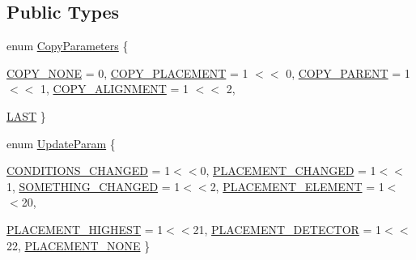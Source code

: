 \subsection*{Public Types}
\begin{DoxyCompactItemize}
\item 
enum \hyperlink{class_d_d4hep_1_1_geometry_1_1_det_element_a7a6c7f35568ec9e910ec981fa866362e}{CopyParameters} \{ \par
\hyperlink{class_d_d4hep_1_1_geometry_1_1_det_element_a7a6c7f35568ec9e910ec981fa866362ea186eaef57988a0161b2ef29172e221fd}{COPY\_\-NONE} =  0, 
\hyperlink{class_d_d4hep_1_1_geometry_1_1_det_element_a7a6c7f35568ec9e910ec981fa866362eaa97821b23390f67fe4c7ecd2c7a1938c}{COPY\_\-PLACEMENT} =  1 $<$$<$ 0, 
\hyperlink{class_d_d4hep_1_1_geometry_1_1_det_element_a7a6c7f35568ec9e910ec981fa866362ea5805992dab0f8bbf04d1faa44a18c96e}{COPY\_\-PARENT} =  1 $<$$<$ 1, 
\hyperlink{class_d_d4hep_1_1_geometry_1_1_det_element_a7a6c7f35568ec9e910ec981fa866362ea1a104f9924d46326682a148492a624e4}{COPY\_\-ALIGNMENT} =  1 $<$$<$ 2, 
\par
\hyperlink{class_d_d4hep_1_1_geometry_1_1_det_element_a7a6c7f35568ec9e910ec981fa866362ea7fc9910904c8a8bd97d629062cf26f10}{LAST}
 \}
\item 
enum \hyperlink{class_d_d4hep_1_1_geometry_1_1_det_element_ab63626b08146a254e1b0d4935a0a6f69}{UpdateParam} \{ \par
\hyperlink{class_d_d4hep_1_1_geometry_1_1_det_element_ab63626b08146a254e1b0d4935a0a6f69aff915aaa2392fde6743b3cd67006f477}{CONDITIONS\_\-CHANGED} =  1$<$$<$0, 
\hyperlink{class_d_d4hep_1_1_geometry_1_1_det_element_ab63626b08146a254e1b0d4935a0a6f69af94cf7a25d0c98c0856da29dd82f834b}{PLACEMENT\_\-CHANGED} =  1$<$$<$1, 
\hyperlink{class_d_d4hep_1_1_geometry_1_1_det_element_ab63626b08146a254e1b0d4935a0a6f69a37416e883976836632461d29a655a225}{SOMETHING\_\-CHANGED} =  1$<$$<$2, 
\hyperlink{class_d_d4hep_1_1_geometry_1_1_det_element_ab63626b08146a254e1b0d4935a0a6f69aabafc5d0a7346e57dffa947c6bcdd4b0}{PLACEMENT\_\-ELEMENT} =  1$<$$<$20, 
\par
\hyperlink{class_d_d4hep_1_1_geometry_1_1_det_element_ab63626b08146a254e1b0d4935a0a6f69abd6b81d065541b64c942a5658c6746ea}{PLACEMENT\_\-HIGHEST} =  1$<$$<$21, 
\hyperlink{class_d_d4hep_1_1_geometry_1_1_det_element_ab63626b08146a254e1b0d4935a0a6f69add54445dc4bb92129794313761212d3a}{PLACEMENT\_\-DETECTOR} =  1$<$$<$22, 
\hyperlink{class_d_d4hep_1_1_geometry_1_1_det_element_ab63626b08146a254e1b0d4935a0a6f69afe1ef8503c8783d26267e8ae74151bbb}{PLACEMENT\_\-NONE}
 \}
\item 
$$
\end{DoxyCompactItemize}
